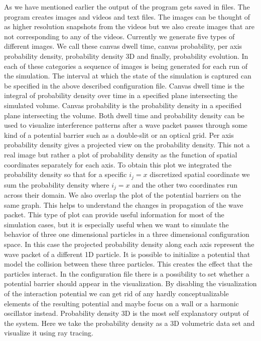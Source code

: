 As we have mentioned earlier the output of the program gets saved in files.
The program creates images and videos and text files.
The images can be thought of as higher resolution snapshots from the videos but we also create images that are not corresponding to any of the videos.
Currently we generate five types of different images.
We call these canvas dwell time, canvas probability, per axis probability density, probability density 3D and finally, probability evolution.
In each of these categories a sequence of images is being generated for each run of the simulation.
The interval at which the state of the simulation is captured can be specified in the above described configuration file.
Canvas dwell time is the integral of probability density over time in a specified plane intersecting the simulated volume.
Canvas probability is the probability density in a specified plane intersecting the volume.
Both dwell time and probability density can be used to visualize interference patterns after a wave packet passes through some kind of a potential barrier such as a double-slit or an optical grid.
Per axis probability density gives a projected view on the probability density.
This not a real image but rather a plot of probability density as the function of spatial coordinates separately for each axis.
To obtain this plot we integrated the probability density so that for a specific $i_j = x$ discretized spatial coordinate we sum the probability density where $i_j = x$ and the other two coordinates run across their domain.
We also overlap the plot of the potential barriers on the same graph.
This helps to understand the changes in propagation of the wave packet.
This type of plot can provide useful information for most of the simulation cases, but it is especially useful when we want to simulate the behavior of three one dimensional particles in a three dimensional configuration space.
In this case the projected probability density along each axis represent the wave packet of a different 1D particle.
It is possible to initialize a potential that model the collision between these three particles.
This creates the effect that the particles interact.
In the configuration file there is a possibility to set whether a potential barrier should appear in the visualization.
By disabling the visualization of the interaction potential we can get rid of any hardly conceptualizable elements of the resulting potential and maybe focus on a wall or a harmonic oscillator instead.
Probability density 3D is the most self explanatory output of the system.
Here we take the probability density as a 3D volumetric data set and visualize it using ray tracing.
